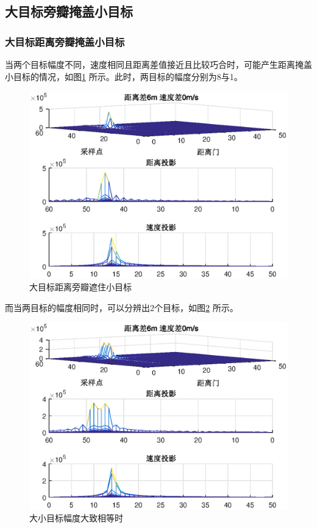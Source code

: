 \documentclass[12pt]{article}
\begin{document}
\subsection{大目标旁瓣掩盖小目标}
\subsubsection{大目标距离旁瓣掩盖小目标}
当两个目标幅度不同，速度相同且距离差值接近且比较巧合时，可能产生距离掩盖小目标的情况，如图\ref{zhegai1}
所示。此时，两目标的幅度分别为8与1。
\begin{figure}[htbp]
  \centering
  \includegraphics[width=\textwidth]{zhegai2}
  \caption{大目标距离旁瓣遮住小目标}\label{zhegai1}
\end{figure}\par
而当两目标的幅度相同时，可以分辨出2个目标，如图\ref{zhegai2}
所示。
\begin{figure}[htbp]
  \centering
  \includegraphics[width=\textwidth]{zhegai1}
  \caption{大小目标幅度大致相等时}\label{zhegai2}
\end{figure}\par
\end{document}
